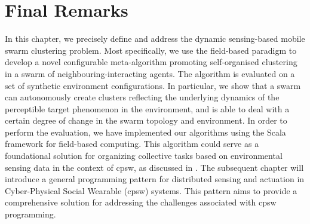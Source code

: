 
\section{Final Remarks}
\label{s:conc}


In this chapter, we precisely define and address
 the dynamic sensing-based mobile swarm clustering problem.
%
Most specifically,
 we use the field-based paradigm
 to develop a novel configurable meta-algorithm
 promoting self-organised clustering in a swarm
 of neighbouring-interacting agents.
%
The algorithm is evaluated on a set of synthetic environment configurations.
%
In particular, we show that a swarm can autonomously
 create clusters reflecting the underlying dynamics of the  perceptible target phenomenon in the environment,
 and is able to deal with a certain degree of change in the swarm topology and environment.
%
In order to perform the evaluation, 
 we have implemented our algorithms using the \scafi{} Scala framework for field-based computing.
%
This algorithm could serve as a foundational solution for organizing collective tasks based on environmental sensing data in the context of \ac{cpsw}, as discussed in .
%
The subsequent chapter will introduce a general programming pattern for distributed sensing and actuation in Cyber-Physical Social Wearable (\ac{cpsw}) systems. 
 This pattern aims to provide a comprehensive solution for addressing the challenges associated with \ac{cpsw} programming.

